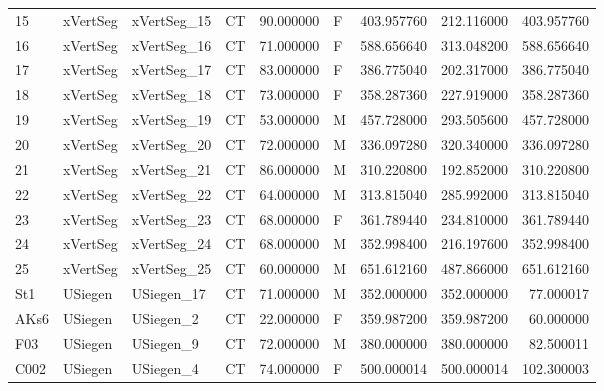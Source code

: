 \begin{tabular}{llllrlrrr}
15     &        xVertSeg &  xVertSeg\_15 &                 CT &  90.000000 &        F &       403.957760 &    212.116000 &  403.957760 \\
16     &        xVertSeg &  xVertSeg\_16 &                 CT &  71.000000 &        F &       588.656640 &    313.048200 &  588.656640 \\
17     &        xVertSeg &  xVertSeg\_17 &                 CT &  83.000000 &        F &       386.775040 &    202.317000 &  386.775040 \\
18     &        xVertSeg &  xVertSeg\_18 &                 CT &  73.000000 &        F &       358.287360 &    227.919000 &  358.287360 \\
19     &        xVertSeg &  xVertSeg\_19 &                 CT &  53.000000 &        M &       457.728000 &    293.505600 &  457.728000 \\
20     &        xVertSeg &  xVertSeg\_20 &                 CT &  72.000000 &        M &       336.097280 &    320.340000 &  336.097280 \\
21     &        xVertSeg &  xVertSeg\_21 &                 CT &  86.000000 &        M &       310.220800 &    192.852000 &  310.220800 \\
22     &        xVertSeg &  xVertSeg\_22 &                 CT &  64.000000 &        M &       313.815040 &    285.992000 &  313.815040 \\
23     &        xVertSeg &  xVertSeg\_23 &                 CT &  68.000000 &        F &       361.789440 &    234.810000 &  361.789440 \\
24     &        xVertSeg &  xVertSeg\_24 &                 CT &  68.000000 &        M &       352.998400 &    216.197600 &  352.998400 \\
25     &        xVertSeg &  xVertSeg\_25 &                 CT &  60.000000 &        M &       651.612160 &    487.866000 &  651.612160 \\
St1    &         USiegen &   USiegen\_17 &                 CT &  71.000000 &        M &       352.000000 &    352.000000 &   77.000017 \\
AKs6   &         USiegen &    USiegen\_2 &                 CT &  22.000000 &        F &       359.987200 &    359.987200 &   60.000000 \\
F03    &         USiegen &    USiegen\_9 &                 CT &  72.000000 &        M &       380.000000 &    380.000000 &   82.500011 \\
C002   &         USiegen &    USiegen\_4 &                 CT &  74.000000 &        F &       500.000014 &    500.000014 &  102.300003 \\

\end{tabular}
